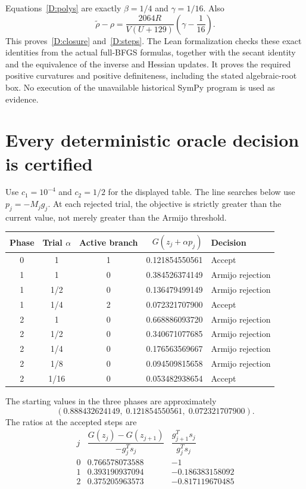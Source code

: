 Equations~\eqref{D:polys} are exactly $\beta=1/4$ and $\gamma=1/16$. Also
\[
 \widetilde\rho-\rho
 =\frac{2064R}{V(U+129)}\left(\gamma-\frac1{16}\right).
\]
This proves~\eqref{D:closure} and~\eqref{D:steps}. The Lean formalization checks these exact identities from the actual full-BFGS formulas, together with the secant identity and the equivalence of the inverse and Hessian updates. It proves the required positive curvatures and positive definiteness, including the stated algebraic-root box. No execution of the unavailable historical SymPy program is used as evidence.


\setcounter{section}{2}
\setcounter{theorem}{1}
\setcounter{lemma}{1}
\setcounter{corollary}{0}
\setcounter{proposition}{0}
\setcounter{remark}{0}
\setcounter{equation}{6}
\section{Every deterministic oracle decision is certified}
Use $c_1=10^{-4}$ and $c_2=1/2$ for the displayed table. The line searches below use $p_j=-M_jg_j$. At each rejected trial, the objective is strictly greater than the current value, not merely greater than the Armijo threshold.
\begin{center}\small
\begin{tabular}{cccrl}\toprule
Phase & Trial $\alpha$ & Active branch & $G(z_j+\alpha p_j)$ & Decision\\\midrule
0&1&1&0.121854550561&Accept\\\midrule
1&1&0&0.384526374149&Armijo rejection\\
1&1/2&0&0.136479499149&Armijo rejection\\
1&1/4&2&0.072321707900&Accept\\\midrule
2&1&0&0.668886093720&Armijo rejection\\
2&1/2&0&0.340671077685&Armijo rejection\\
2&1/4&0&0.176563569667&Armijo rejection\\
2&1/8&0&0.094509815658&Armijo rejection\\
2&1/16&0&0.053482938654&Accept\\\bottomrule
\end{tabular}
\end{center}
The starting values in the three phases are approximately
\[
 (0.888432624149,\;0.121854550561,\;0.072321707900).
\]
The ratios at the accepted steps are
\[
\begin{array}{c|rr}
 j & \dfrac{G(z_j)-G(z_{j+1})}{-g_j^Ts_j}
 &\dfrac{g_{j+1}^Ts_j}{g_j^Ts_j}\\\hline
0&0.766578073588&-1\\
1&0.393190937094&-0.186383158092\\
2&0.375205963573&-0.817119670485
\end{array}
\]
